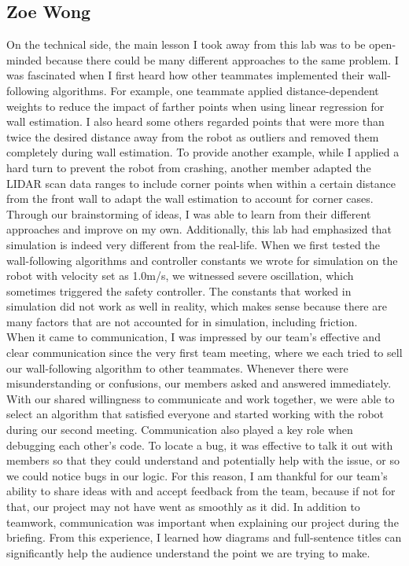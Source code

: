 \documentclass{article}
\begin{document}
\subsection{Zoe Wong}

On the technical side, the main lesson I took away from this lab was to be open-minded because there could be many different approaches to the same problem. I was fascinated when I first heard how other teammates implemented their wall-following algorithms. For example, one teammate applied distance-dependent weights to reduce the impact of farther points when using linear regression for wall estimation. I also heard some others regarded points that were more than twice the desired distance away from the robot as outliers and removed them completely during wall estimation. To provide another example, while I applied a hard turn to prevent the robot from crashing, another member adapted the LIDAR scan data ranges to include corner points when within a certain distance from the front wall to adapt the wall estimation to account for corner cases. Through our brainstorming of ideas, I was able to learn from their different approaches and improve on my own. Additionally, this lab had emphasized that simulation is indeed very different from the real-life. When we first tested the wall-following algorithms and controller constants we wrote for simulation on the robot with velocity set as 1.0m/s, we witnessed severe oscillation, which sometimes triggered the safety controller. The constants that worked in simulation did not work as well in reality, which makes sense because there are many factors that are not accounted for in simulation, including friction. \\

When it came to communication, I was impressed by our team's effective and clear communication since the very first team meeting, where we each tried to sell our wall-following algorithm to other teammates. Whenever there were misunderstanding or confusions, our members asked and answered immediately. With our shared willingness to communicate and work together, we were able to select an algorithm that satisfied everyone and started working with the robot during our second meeting. Communication also played a key role when debugging each other's code. To locate a bug, it was effective to talk it out with members so that they could understand and potentially help with the issue, or so we could notice bugs in our logic. For this reason, I am thankful for our team's ability to share ideas with and accept feedback from the team, because if not for that, our project may not have went as smoothly as it did. In addition to teamwork, communication was important when explaining our project during the briefing. From this experience, I learned how diagrams and full-sentence titles can significantly help the audience understand the point we are trying to make. \\
\end{document}
